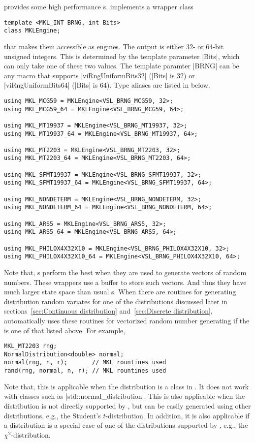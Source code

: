\mkl provides some high performance \rng{}s. \mckl implements a wrapper class
\begin{verbatim}
template <MKL_INT BRNG, int Bits>
class MKLEngine;
\end{verbatim}
that makes them accessible as \cpp engines. The output is either 32- or 64-bit
unsigned integers. This is determined by the template parameter |Bits|, which
can only take one of these two values. The template paramter |BRNG| can be any
\mkl \brng macro that supports |viRngUniformBits32| (|Bits| is 32) or
|viRngUniformBits64| (|Bits| is 64). Type aliases are listed in below.
\begin{verbatim}
using MKL_MCG59 = MKLEngine<VSL_BRNG_MCG59, 32>;
using MKL_MCG59_64 = MKLEngine<VSL_BRNG_MCG59, 64>;

using MKL_MT19937 = MKLEngine<VSL_BRNG_MT19937, 32>;
using MKL_MT19937_64 = MKLEngine<VSL_BRNG_MT19937, 64>;

using MKL_MT2203 = MKLEngine<VSL_BRNG_MT2203, 32>;
using MKL_MT2203_64 = MKLEngine<VSL_BRNG_MT2203, 64>;

using MKL_SFMT19937 = MKLEngine<VSL_BRNG_SFMT19937, 32>;
using MKL_SFMT19937_64 = MKLEngine<VSL_BRNG_SFMT19937, 64>;

using MKL_NONDETERM = MKLEngine<VSL_BRNG_NONDETERM, 32>;
using MKL_NONDETERM_64 = MKLEngine<VSL_BRNG_NONDETERM, 64>;

using MKL_ARS5 = MKLEngine<VSL_BRNG_ARS5, 32>;
using MKL_ARS5_64 = MKLEngine<VSL_BRNG_ARS5, 64>;

using MKL_PHILOX4X32X10 = MKLEngine<VSL_BRNG_PHILOX4X32X10, 32>;
using MKL_PHILOX4X32X10_64 = MKLEngine<VSL_BRNG_PHILOX4X32X10, 64>;
\end{verbatim}
Note that, \mkl \rng{}s perform the best when they are used to generate vectors
of random numbers. These wrappers use a buffer to store such vectors. And thus
they have much larger state space than usual \rng{}s. When there are \mkl
routines for generating distribution random variates for one of the
distributions discussed later in sections~\ref{sec:Continuous distribution}
and~\ref{sec:Discrete distribution}, \mckl automatically uses these routines
for vectorized random number generating if the \rng is one of that listed
above. For example,
\begin{verbatim}
MKL_MT2203 rng;
NormalDistribution<double> normal;
normal(rng, n, r);       // MKL rountines used
rand(rng, normal, n, r); // MKL rountines used
\end{verbatim}
Note that, this is applicable when the distribution is a class in \mckl. It
does not work with classes such as |std::normal_distribution|. This is also
applicable when the distribution is not directly supported by \mkl, but can be
easily generated using other distributions, e.g., the Student's
$t$-distribution. In addition, it is also applicable if a distribution is a
special case of one of the distributions supported by \mkl, e.g., the
$\chi^2$-distribution.

